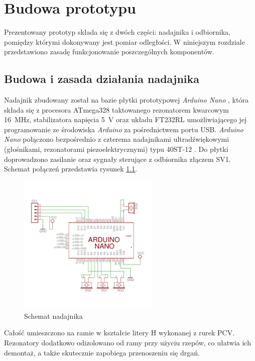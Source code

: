 
\chapter{Budowa prototypu}

Prezentowany prototyp składa się z dwóch części: nadajnika i odbiornika, pomiędzy którymi
dokonywany jest pomiar odległości. W niniejszym rozdziale przedstawiono zasadę funkcjonowanie 
poszczególnych komponentów.

\section{Budowa i zasada działania nadajnika}

Nadajnik zbudowany został na bazie płytki prototypowej \textit{Arduino Nano} \cite{bib:arduinoNano},
która składa się z procesora ATmega328 \cite{bib:atmega328} taktowanego rezonatorem kwarcowym \SI{16}{MHz},
stabilizatora napięcia \SI{5}{V} oraz układu FT232RL umożliwiającego 
jej programowanie  ze środowiska \textit{Arduino} \cite{bib:Arduino} za pośrednictwem portu USB. 
\textit{Arduino Nano} połączono 
bezpośrednio z czterema nadajnikami ultradźwiękowymi (głośnikami, rezonatorami piezoelektrycznymi) typu 40ST-12 \cite{bib:40ST12}.
Do płytki doprowadzono zasilanie oraz sygnały sterujące z odbiornika złączem SV1. 
Schemat połączeń przedstawia rysunek \ref{fig:nadajnik_schemat}.

 \begin{figure}[h]
    \centering
    \includegraphics[width=0.6\textwidth, trim= 0mm 0mm 0mm 0mm,clip]{transmitter}
    \caption{Schemat nadajnika}
    \label{fig:nadajnik_schemat}
\end{figure}

Całość umieszczono na ramie w kształcie litery H wykonanej z rurek PCV.
Rezonatory dodatkowo odizolowano  od ramy przy użyciu rzepów, co ułatwia ich demontaż, a także skutecznie
zapobiega przenoszeniu się drgań. 

